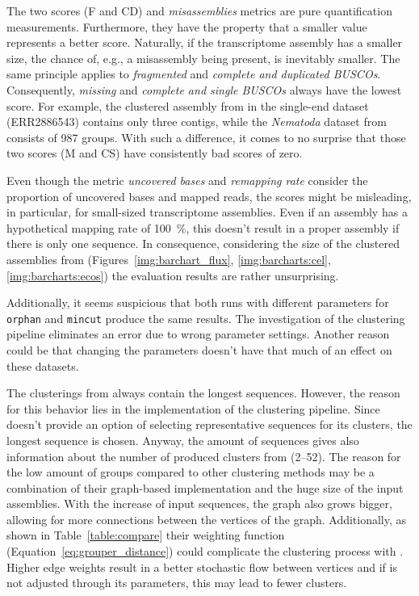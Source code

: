 \documentclass[12pt,a4paper,english]{article}
\begin{document}
		The two \busco scores (F and CD) and \textit{misassemblies} metrics are pure quantification measurements. Furthermore, they have the property that a smaller value represents a better score.
		Naturally, if the transcriptome assembly has a smaller size, the chance of, e.g., a misassembly being present, is inevitably smaller. The same principle applies to \textit{fragmented} and \textit{complete and duplicated BUSCOs}. 
		Consequently, \textit{missing} and \textit{complete and single BUSCOs} always have the lowest score. For example, the clustered assembly from \grouper in the single-end \celegans dataset (ERR2886543) contains only three contigs, while the \textit{Nematoda} dataset from \busco consists of 987 \busco groups. With such a difference, it comes to no surprise that those two \busco scores (M and CS) have consistently bad scores of zero.
		
		Even though the metric \textit{uncovered bases} and \textit{remapping rate} consider the proportion of uncovered bases and mapped reads, the scores might be misleading, in particular, for small-sized transcriptome assemblies. Even if an assembly has a hypothetical mapping rate of 100~\%, this doesn't result in a proper assembly if there is only one sequence.    
		In consequence, considering the size of the clustered assemblies from \grouper (Figures~\ref{img:barchart_flux}, \ref{img:barcharts:cel}, \ref{img:barcharts:ecos}) the evaluation results are rather unsurprising.
		
		Additionally, it seems suspicious that both runs with different parameters for \texttt{orphan} and \texttt{mincut} produce the same results. The investigation of the clustering pipeline eliminates an error due to wrong parameter settings. Another reason could be that changing the parameters doesn't have that much of an effect on these datasets.
		
		The clusterings from \grouper always contain the longest sequences. However, the reason for this behavior lies in the implementation of the clustering pipeline. Since \grouper doesn't provide an option of selecting representative sequences for its clusters, the longest sequence is chosen.
		Anyway, the amount of sequences gives also information about the number of produced clusters from \grouper (2--52). The reason for the low amount of groups compared to other clustering methods may be a combination of their graph-based implementation and the huge size of the input assemblies.
		With the increase of input sequences, the graph also grows bigger, allowing for more connections between the vertices of the graph. Additionally, as shown in Table~\ref{table:compare} their weighting function (Equation~\ref{eq:grouper_distance}) could complicate the clustering process with \mcl. Higher edge weights result in a better stochastic flow between vertices and if \mcl is not adjusted through its parameters, this may lead to fewer clusters.
	
\end{document}
